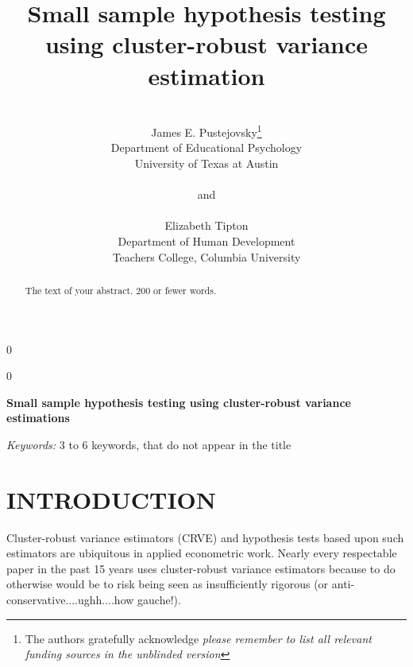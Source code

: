 \documentclass[12pt]{article}\usepackage[]{graphicx}\usepackage[]{color}
\newcommand{\blind}{0}
\begin{document}
\def\spacingset#1{\renewcommand{\baselinestretch}%
{#1}\small\normalsize} \spacingset{1}



\blind
{
  \title{\bf Small sample hypothesis testing using cluster-robust variance estimation}
  \author{\\James E. Pustejovsky\thanks{
    The authors gratefully acknowledge \textit{please remember to list all relevant funding sources in the unblinded version}}\hspace{.2cm}\\
    Department of Educational Psychology \\ 
    University of Texas at Austin\\ \\
    and \\ \\
    Elizabeth Tipton \\
    Department of Human Development \\ 
    Teachers College, Columbia University}
  \maketitle
} \fi

\blind
{
  \bigskip
  \bigskip
  \bigskip
  \begin{center}
    {\LARGE\bf Small sample hypothesis testing using cluster-robust variance estimations}
\end{center}
  \medskip
} \fi

\bigskip
\begin{abstract}
The text of your abstract.  200 or fewer words.
\end{abstract}

\noindent%
{\it Keywords:}  3 to 6 keywords, that do not appear in the title
\vfill

\newpage
\spacingset{1.45} %

\section{INTRODUCTION}
\label{sec:intro}



Cluster-robust variance estimators (CRVE) and hypothesis tests based upon such estimators are ubiquitous in applied econometric work. Nearly every respectable paper in the past 15 years uses cluster-robust variance estimators because to do otherwise would be to risk being seen as insufficiently rigorous (or anti-conservative....ughh....how gauche!).
\end{document}
